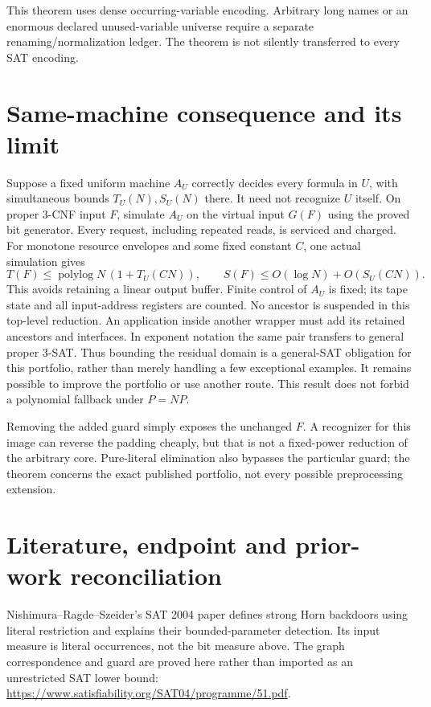 \documentclass[11pt]{article}
\begin{document}
This theorem uses dense occurring-variable encoding. Arbitrary long
names or an enormous declared unused-variable universe require a
separate renaming/normalization ledger. The theorem is not silently
transferred to every SAT encoding.

\section{Same-machine consequence and its limit}
Suppose a fixed uniform machine $A_U$ correctly decides every formula
in $U$, with simultaneous bounds $T_U(N),S_U(N)$ there. It need not
recognize $U$ itself. On proper 3-CNF input $F$, simulate $A_U$ on the
virtual input $G(F)$ using the proved bit generator. Every request,
including repeated reads, is serviced and charged. For monotone resource
envelopes and some fixed constant $C$, one actual simulation gives
\[
 T(F)\le \operatorname{polylog}N\,(1+T_U(CN)),\qquad
 S(F)\le O(\log N)+O(S_U(CN)).
\]
This avoids retaining a linear output buffer. Finite control of $A_U$
is fixed; its tape state and all input-address registers are counted.
No ancestor is suspended in this top-level reduction. An application
inside another wrapper must add its retained ancestors and interfaces.
In exponent notation the same pair transfers to general proper 3-SAT.
Thus bounding the residual domain is a general-SAT obligation for this
portfolio, rather than merely handling a few exceptional examples.
It remains possible to improve the portfolio or use another route.
This result does not forbid a polynomial fallback under $P=NP$.

Removing the added guard simply exposes the unchanged $F$. A recognizer
for this image can reverse the padding cheaply, but that is not a
fixed-power reduction of the arbitrary core. Pure-literal elimination
also bypasses the particular guard; the theorem concerns the exact
published portfolio, not every possible preprocessing extension.

\section{Literature, endpoint and prior-work reconciliation}
Nishimura--Ragde--Szeider's SAT 2004 paper defines strong Horn backdoors
using literal restriction and explains their bounded-parameter detection.
Its input measure is literal occurrences, not the bit measure above.
The graph correspondence and guard are proved here rather than imported
as an unrestricted SAT lower bound:
\url{https://www.satisfiability.org/SAT04/programme/51.pdf}.
\end{document}
